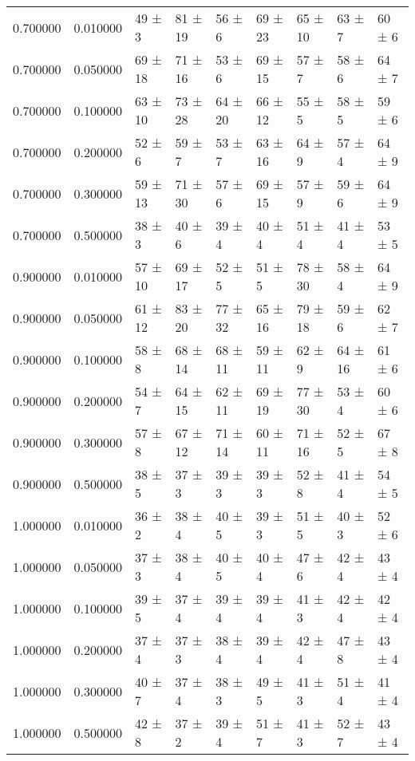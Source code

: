 \begin{table}
\begin{tabular}{rrlllllll}
0.700000 & 0.010000 & 49 ± 3 & 81 ± 19 & 56 ± 6 & 69 ± 23 & 65 ± 10 & 63 ± 7 & 60 ± 6 \\
0.700000 & 0.050000 & 69 ± 18 & 71 ± 16 & 53 ± 6 & 69 ± 15 & 57 ± 7 & 58 ± 6 & 64 ± 7 \\
0.700000 & 0.100000 & 63 ± 10 & 73 ± 28 & 64 ± 20 & 66 ± 12 & 55 ± 5 & 58 ± 5 & 59 ± 6 \\
0.700000 & 0.200000 & 52 ± 6 & 59 ± 7 & 53 ± 7 & 63 ± 16 & 64 ± 9 & 57 ± 4 & 64 ± 9 \\
0.700000 & 0.300000 & 59 ± 13 & 71 ± 30 & 57 ± 6 & 69 ± 15 & 57 ± 9 & 59 ± 6 & 64 ± 9 \\
0.700000 & 0.500000 & 38 ± 3 & 40 ± 6 & 39 ± 4 & 40 ± 4 & 51 ± 4 & 41 ± 4 & 53 ± 5 \\
0.900000 & 0.010000 & 57 ± 10 & 69 ± 17 & 52 ± 5 & 51 ± 5 & 78 ± 30 & 58 ± 4 & 64 ± 9 \\
0.900000 & 0.050000 & 61 ± 12 & 83 ± 20 & 77 ± 32 & 65 ± 16 & 79 ± 18 & 59 ± 6 & 62 ± 7 \\
0.900000 & 0.100000 & 58 ± 8 & 68 ± 14 & 68 ± 11 & 59 ± 11 & 62 ± 9 & 64 ± 16 & 61 ± 6 \\
0.900000 & 0.200000 & 54 ± 7 & 64 ± 15 & 62 ± 11 & 69 ± 19 & 77 ± 30 & 53 ± 4 & 60 ± 6 \\
0.900000 & 0.300000 & 57 ± 8 & 67 ± 12 & 71 ± 14 & 60 ± 11 & 71 ± 16 & 52 ± 5 & 67 ± 8 \\
0.900000 & 0.500000 & 38 ± 5 & 37 ± 3 & 39 ± 3 & 39 ± 3 & 52 ± 8 & 41 ± 4 & 54 ± 5 \\
1.000000 & 0.010000 & 36 ± 2 & 38 ± 4 & 40 ± 5 & 39 ± 3 & 51 ± 5 & 40 ± 3 & 52 ± 6 \\
1.000000 & 0.050000 & 37 ± 3 & 38 ± 4 & 40 ± 5 & 40 ± 4 & 47 ± 6 & 42 ± 4 & 43 ± 4 \\
1.000000 & 0.100000 & 39 ± 5 & 37 ± 4 & 39 ± 4 & 39 ± 4 & 41 ± 3 & 42 ± 4 & 42 ± 4 \\
1.000000 & 0.200000 & 37 ± 4 & 37 ± 3 & 38 ± 4 & 39 ± 4 & 42 ± 4 & 47 ± 8 & 43 ± 4 \\
1.000000 & 0.300000 & 40 ± 7 & 37 ± 4 & 38 ± 3 & 49 ± 5 & 41 ± 3 & 51 ± 4 & 41 ± 4 \\
1.000000 & 0.500000 & 42 ± 8 & 37 ± 2 & 39 ± 4 & 51 ± 7 & 41 ± 3 & 52 ± 7 & 43 ± 4 \\
\bottomrule
\end{tabular}
\end{table}
